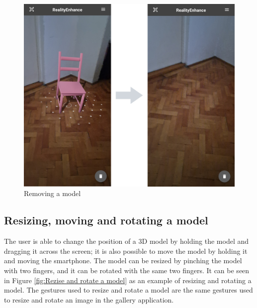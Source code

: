 \begin{figure}[ht]
    \begin{center}
        \includegraphics[width=1\textwidth]{img/App_screenshots/Model-removed.png}
        \caption{Removing a model}
        \label{fig:remove-a-model}
    \end{center}
\end{figure}

\pagebreak

\subsection{Resizing, moving and rotating a model}
The user is able to change the position of a \ac{3D} model by holding the model and dragging it across the screen; it is also possible to move the model by holding it and moving the smartphone.  The model can be resized by pinching the model with two fingers, and it can be rotated with the same two fingers. It can be seen in Figure \ref{fig:Rezise and rotate a model} as an example of resizing and rotating a model. The gestures used to resize and rotate a model are the same gestures used to resize and rotate an image in the gallery application.

